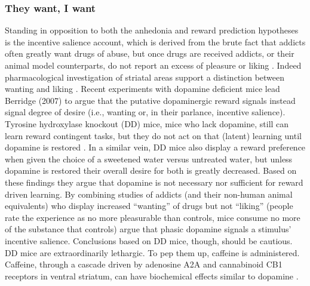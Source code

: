 \subsubsection{They want, I want}
\label{subsub:salience}
Standing in opposition to both the anhedonia and reward prediction hypotheses is the incentive salience account, which is derived from the brute fact that addicts often greatly want drugs of abuse, but once drugs are received addicts, or their animal model counterparts, do not report an excess of pleasure or liking \cite{Robinson:1993p8987}.  Indeed pharmacological investigation of striatal areas support a distinction between wanting and liking \cite{Berridge:2003p8998}.  Recent experiments with dopamine deficient mice lead Berridge (2007) to argue that the putative dopaminergic reward signals instead signal degree of desire (i.e., wanting or, in their parlance, incentive salience).  Tyrosine hydroxylase knockout (DD) mice, mice who lack dopamine, still can learn reward contingent tasks, but they do not act on that (latent) learning until dopamine is restored \cite{Berridge:2007p7235}. In a similar vein, DD mice also display a reward preference when given the choice of a sweetened water versus untreated water, but unless dopamine is restored their overall desire for both is greatly decreased.  Based on these findings they argue that dopamine is not necessary nor sufficient for reward driven learning.  By combining studies of addicts (and their non-human animal equivalents) who display increased ``wanting'' of drugs but not ``liking'' (people rate the experience as no more pleasurable than controls, mice consume no more of the substance that controls)  argue that phasic dopamine signals a stimulus' incentive salience.  Conclusions based on DD mice, though, should be cautious.  DD mice are extraordinarily lethargic.  To pep them up, caffeine is administered.  Caffeine, through a cascade driven by adenosine A2A and cannabinoid CB1 receptors in ventral striatum, can have biochemical effects similar to dopamine \cite{Lazarus:2011p8137, Rossi:2010p7252}.

